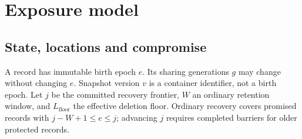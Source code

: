 \documentclass[pdflatex,sn-mathphys-num]{sn-jnl}%
\theoremstyle{plain}
\theoremstyle{definition}
\begin{document}
\section{Exposure model}\label{sec:model}

\subsection{State, locations and compromise}
A record has immutable birth epoch $e$. Its sharing generations $g$ may change without changing $e$. Snapshot version $v$ is a container identifier, not a birth epoch. Let $j$ be the committed recovery frontier, $W$ an ordinary retention window, and $L_{\mathrm{floor}}$ the effective deletion floor. Ordinary recovery covers promised records with $j-W+1\le e\le j$; advancing $j$ requires completed barriers for older protected records.
\end{document}
